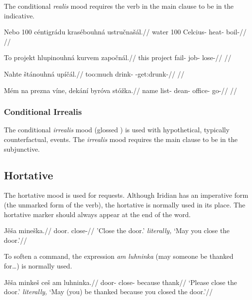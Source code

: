 The conditional \emph{realis} mood requires the verb in the main clause to be in the indicative.


\pex
\begingl
\gla Nebo 100 c\'entigr\'adu kras\'ebouhn\'a ustru\v{c}na\v{s}\'al.//
\glb water 100 Celcius- heat- boil-//
\glft {}//
\endgl
\xe

\pex
\begingl
\gla To projekt hlupinouhn\'a kurvem zapo\v{c}n\'al.//
\glb this project fail- job- lose-//
\glft {}//
\endgl
\xe

\pex
\begingl
\gla Nahte \v{s}t\'anouhn\'a up\'i\v{c}\'al.//
\glb too:much drink- -get:drunk-//
\glft {}//
\endgl
\xe

\pex
\begingl
\gla M\'em na prezna v\'ine, dek\'an\'i byr\'ova st\'o\v{z}ka.//
\glb name  list-  dean- office- go-//
\glft {}//
\endgl
\xe

\subsubsection{Conditional Irrealis}
The conditional \textit{irrealis} mood (glossed ) is used with hypothetical, typically counterfactual, events. The \emph{irrealis} mood requires the main clause to be in the subjunctive.


\subsection{Hortative}
\par The hortative mood is used for requests. Although Iridian has an imperative form (the unmarked form of the verb), the hortative is normally used in its place. The hortative marker should always appear at the end of the word.

	\pex
\begingl
\gla Jê\v{s}a mine\v{s}ka.//
\glb door. close-//
\glft 'Close the door.' \textit{literally,} `May you close the door.'//
\endgl
\xe

\par To soften a command, the expression \textit{am luhninka} (may someone be thanked for\ldots) is normally used.

\pex
\begingl
\gla Jê\v{s}a minke\v{s} ce\v{s} am luhninka.//
\glb door- close-  because thank//
\glft  `Please close the door.' \textit{literally,} `May (you) be thanked because you closed the door.'//
\endgl
\xe

